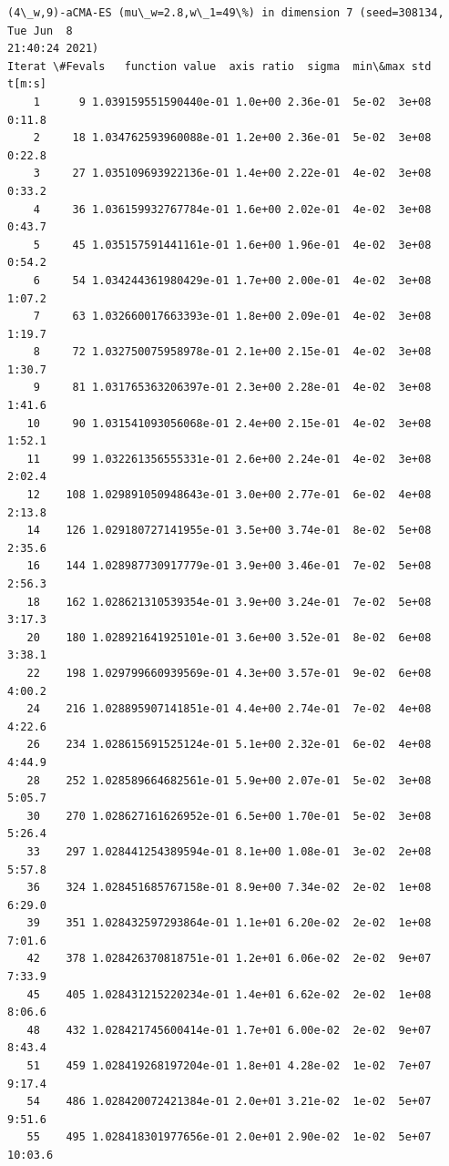 \documentclass[11pt]{article}
\begin{document}
    \begin{Verbatim}[commandchars=\\\{\}]
(4\_w,9)-aCMA-ES (mu\_w=2.8,w\_1=49\%) in dimension 7 (seed=308134, Tue Jun  8
21:40:24 2021)
Iterat \#Fevals   function value  axis ratio  sigma  min\&max std  t[m:s]
    1      9 1.039159551590440e-01 1.0e+00 2.36e-01  5e-02  3e+08 0:11.8
    2     18 1.034762593960088e-01 1.2e+00 2.36e-01  5e-02  3e+08 0:22.8
    3     27 1.035109693922136e-01 1.4e+00 2.22e-01  4e-02  3e+08 0:33.2
    4     36 1.036159932767784e-01 1.6e+00 2.02e-01  4e-02  3e+08 0:43.7
    5     45 1.035157591441161e-01 1.6e+00 1.96e-01  4e-02  3e+08 0:54.2
    6     54 1.034244361980429e-01 1.7e+00 2.00e-01  4e-02  3e+08 1:07.2
    7     63 1.032660017663393e-01 1.8e+00 2.09e-01  4e-02  3e+08 1:19.7
    8     72 1.032750075958978e-01 2.1e+00 2.15e-01  4e-02  3e+08 1:30.7
    9     81 1.031765363206397e-01 2.3e+00 2.28e-01  4e-02  3e+08 1:41.6
   10     90 1.031541093056068e-01 2.4e+00 2.15e-01  4e-02  3e+08 1:52.1
   11     99 1.032261356555331e-01 2.6e+00 2.24e-01  4e-02  3e+08 2:02.4
   12    108 1.029891050948643e-01 3.0e+00 2.77e-01  6e-02  4e+08 2:13.8
   14    126 1.029180727141955e-01 3.5e+00 3.74e-01  8e-02  5e+08 2:35.6
   16    144 1.028987730917779e-01 3.9e+00 3.46e-01  7e-02  5e+08 2:56.3
   18    162 1.028621310539354e-01 3.9e+00 3.24e-01  7e-02  5e+08 3:17.3
   20    180 1.028921641925101e-01 3.6e+00 3.52e-01  8e-02  6e+08 3:38.1
   22    198 1.029799660939569e-01 4.3e+00 3.57e-01  9e-02  6e+08 4:00.2
   24    216 1.028895907141851e-01 4.4e+00 2.74e-01  7e-02  4e+08 4:22.6
   26    234 1.028615691525124e-01 5.1e+00 2.32e-01  6e-02  4e+08 4:44.9
   28    252 1.028589664682561e-01 5.9e+00 2.07e-01  5e-02  3e+08 5:05.7
   30    270 1.028627161626952e-01 6.5e+00 1.70e-01  5e-02  3e+08 5:26.4
   33    297 1.028441254389594e-01 8.1e+00 1.08e-01  3e-02  2e+08 5:57.8
   36    324 1.028451685767158e-01 8.9e+00 7.34e-02  2e-02  1e+08 6:29.0
   39    351 1.028432597293864e-01 1.1e+01 6.20e-02  2e-02  1e+08 7:01.6
   42    378 1.028426370818751e-01 1.2e+01 6.06e-02  2e-02  9e+07 7:33.9
   45    405 1.028431215220234e-01 1.4e+01 6.62e-02  2e-02  1e+08 8:06.6
   48    432 1.028421745600414e-01 1.7e+01 6.00e-02  2e-02  9e+07 8:43.4
   51    459 1.028419268197204e-01 1.8e+01 4.28e-02  1e-02  7e+07 9:17.4
   54    486 1.028420072421384e-01 2.0e+01 3.21e-02  1e-02  5e+07 9:51.6
   55    495 1.028418301977656e-01 2.0e+01 2.90e-02  1e-02  5e+07 10:03.6
    \end{Verbatim}
\end{document}
